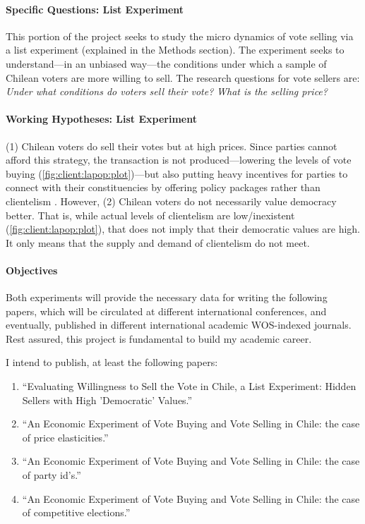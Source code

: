 \documentclass[onesided]{article}\usepackage[]{graphicx}\usepackage[]{color}
\begin{document}
\paragraph{Specific Questions: List Experiment} This portion of the project seeks to study the micro dynamics of vote selling via a list experiment (explained in the Methods section). The experiment seeks to understand---in an unbiased way---the conditions under which a sample of Chilean voters are more willing to sell. The research questions for vote sellers are: \emph{Under what conditions do voters sell their vote?} \emph{What is the selling price?}

\paragraph{Working Hypotheses: List Experiment} (1) Chilean voters do sell their votes but at high prices. Since parties cannot afford this strategy, the transaction is not produced---lowering the levels of vote buying (\autoref{fig:client:lapop:plot})---but also putting heavy incentives for parties to connect with their constituencies by offering policy packages rather than clientelism \parencite{Kitschelt2000}. However, (2) Chilean voters do not necessarily value democracy better. That is, while actual levels of clientelism are low/inexistent (\autoref{fig:client:lapop:plot}), that does not imply that their democratic values are high. It only means that the supply and demand of clientelism do not meet. %


\paragraph{Objectives} Both experiments will provide the necessary data for writing the following papers, which will be circulated at different international conferences, and eventually, published in different international academic WOS-indexed journals. Rest assured, this project is fundamental to build my academic career.

I intend to publish, at least the following papers:


\begin{enumerate}
	\item ``Evaluating Willingness to Sell the Vote in Chile, a List Experiment: Hidden Sellers with High 'Democratic' Values.''
	\item ``An Economic Experiment of Vote Buying and Vote Selling in Chile: the case of price elasticities.''
	\item ``An Economic Experiment of Vote Buying and Vote Selling in Chile: the case of party id's.''
	\item ``An Economic Experiment of Vote Buying and Vote Selling in Chile: the case of competitive elections.''
\end{enumerate}
\end{document}
